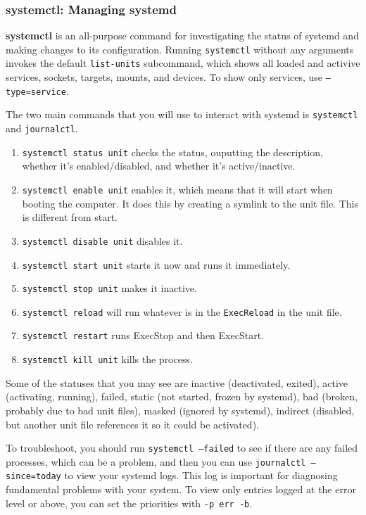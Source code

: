 \documentclass{article}
\theoremstyle{definition}
\begin{document}
    \subsubsection{systemctl: Managing systemd} 

      \textbf{systemctl} is an all-purpose command for investigating the status of systemd and making changes to its configuration. Running \texttt{systemctl} without any arguments invokes the default \texttt{list-units} subcommand, which shows all loaded and activive services, sockets, targets, mounts, and devices. To show only services, use \texttt{--type=service}. 

      The two main commands that you will use to interact with systemd is \texttt{systemctl} and \texttt{journalctl}. 
      
      \begin{enumerate}
        \item \texttt{systemctl status unit} checks the status, ouputting the description, whether it's enabled/disabled, and whether it's active/inactive. 
        \item \texttt{systemctl enable unit} enables it, which means that it will start when booting the computer. It does this by creating a symlink to the unit file. This is different from start. 
        \item \texttt{systemctl disable unit} disables it. 
        \item \texttt{systemctl start unit} starts it now and runs it immediately. 
        \item \texttt{systemctl stop unit} makes it inactive. 
        \item \texttt{systemctl reload} will run whatever is in the \texttt{ExecReload} in the unit file. 
        \item \texttt{systemctl restart} runs ExecStop and then ExecStart. 
        \item \texttt{systemctl kill unit} kills the process. 
      \end{enumerate}

      Some of the statuses that you may see are inactive (deactivated, exited), active (activating, running), failed, static (not started, frozen by systemd), bad (broken, probably due to bad unit files), masked (ignored by systemd), indirect (disabled, but another unit file references it so it could be activated). 

      To troubleshoot, you should run \texttt{systemctl --failed} to see if there are any failed processes, which can be a problem, and then you can use \texttt{journalctl --since=today} to view your systemd logs. This log is important for diagnosing fundamental problems with your system. To view only entries logged at the error level or above, you can set the priorities with \texttt{-p err -b}. 
\end{document}
